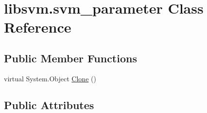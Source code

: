 \hypertarget{classlibsvm_1_1svm__parameter}{
\section{libsvm.svm\_\-parameter Class Reference}
\label{classlibsvm_1_1svm__parameter}
}
\subsection*{Public Member Functions}
\begin{DoxyCompactItemize}
\item 
virtual System.Object \hyperlink{classlibsvm_1_1svm__parameter_aa08cc72b1325fd408341762581360422}{Clone} ()
\end{DoxyCompactItemize}
\subsection*{Public Attributes}
